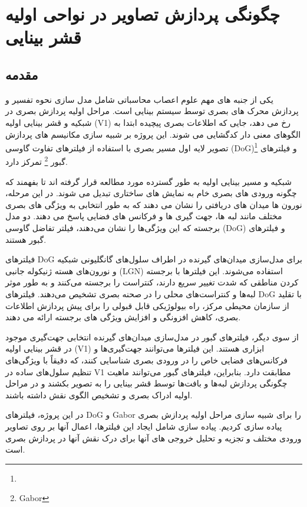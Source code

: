 
\newpage
\chapter{چگونگی پردازش تصاویر در نواحی اولیه قشر بینایی}
    \section{مقدمه}
        یکی از جنبه های مهم علوم اعصاب محاسباتی شامل مدل سازی نحوه تفسیر و پردازش محرک های بصری توسط سیستم بینایی است. مراحل اولیه پردازش بصری در شبکیه و قشر بینایی اولیه 
        (V1) 
        رخ می دهد، جایی که اطلاعات بصری پیچیده ابتدا به الگوهای معنی دار کدگشایی می شوند. این پروژه بر شبیه سازی مکانیسم های پردازش تصویر لایه اول مسیر بصری با استفاده از فیلترهای تفاوت گاوسی 
        (DoG)\footnote{}
        و فیلترهای گبور
        \footnote{Gabor}
        تمرکز دارد.

        شبکیه و مسیر بینایی اولیه به طور گسترده مورد مطالعه قرار گرفته اند تا بفهمند که چگونه ورودی های بصری خام به نمایش های ساختاری تبدیل می شوند. در این مرحله، نورون ها میدان های دریافتی را نشان می دهند که به طور انتخابی به ویژگی های بصری مختلف مانند لبه ها، جهت گیری ها و فرکانس های فضایی پاسخ می دهند. دو مدل برجسته که این ویژگی‌ها را نشان می‌دهند، فیلتر تفاضل گاوسی 
        (DoG) 
        و فیلترهای گبور هستند.
        
        فیلترهای 
        DoG 
        برای مدل‌سازی میدان‌های گیرنده در اطراف سلول‌های گانگلیونی شبکیه و نورون‌های هسته ژنیکوله جانبی 
        (LGN) 
        استفاده می‌شوند. این فیلترها با برجسته کردن مناطقی که شدت تغییر سریع دارند، کنتراست را برجسته می‌کنند و به طور موثر لبه‌ها و کنتراست‌های محلی را در صحنه بصری تشخیص می‌دهند. فیلترهای 
        DoG 
        با تقلید از سازمان محیطی مرکز، راه بیولوژیکی قابل قبولی را برای پیش پردازش اطلاعات بصری، کاهش افزونگی و افزایش ویژگی های برجسته ارائه می دهند.
        
        از سوی دیگر، فیلترهای گبور در مدل‌سازی میدان‌های گیرنده انتخابی جهت‌گیری موجود در قشر بینایی اولیه 
        (V1) 
        ابزاری هستند. این فیلترها می‌توانند جهت‌گیری‌ها و فرکانس‌های فضایی خاص را در ورودی بصری شناسایی کنند، که دقیقاً با ویژگی‌های تنظیم سلول‌های ساده در 
        V1 
        مطابقت دارد. بنابراین، فیلترهای گبور می‌توانند ماهیت چگونگی پردازش لبه‌ها و بافت‌ها توسط قشر بینایی را به تصویر بکشند و در مراحل اولیه ادراک بصری و تشخیص الگوی نقش داشته باشند.
        
        در این پروژه، فیلترهای 
        DoG و Gabor 
        را برای شبیه سازی مراحل اولیه پردازش بصری پیاده سازی کردیم. پیاده سازی شامل ایجاد این فیلترها، اعمال آنها بر روی تصاویر ورودی مختلف و تجزیه و تحلیل خروجی های آنها برای درک نقش آنها در پردازش بصری است.
        
